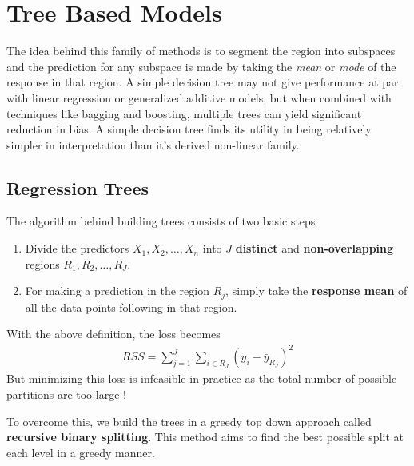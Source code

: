 \documentclass[11pt, a4paper]{article}
\begin{document}
    \section{Tree Based Models}
    The idea behind this family of methods is to segment the region into subspaces and the prediction for any subspace is made by taking the \emph{mean} or \emph{mode} of the response in that region.\newline
    A simple decision tree may not give performance at par with linear regression or generalized additive models, but when combined with techniques like bagging and boosting, multiple trees can yield significant reduction in bias.\newline
    A simple decision tree finds its utility in being relatively simpler in interpretation than it's derived non-linear family.

    \subsection{Regression Trees}
    The algorithm behind building trees consists of two basic steps
    \begin{enumerate}
        \item Divide the predictors $X_{1}, X_{2}, \ldots, X_{n}$ into $J$ \textbf{distinct} and \textbf{non-overlapping} regions $R_{1}, R_{2}, \ldots, R_{J}$.
        \item For making a prediction in the region $R_{j}$, simply take the \textbf{response mean} of all the data points following in that region.
    \end{enumerate}
    With the above definition, the loss becomes
    \begin{align*}
        RSS = \sum_{j=1}^{J} \sum_{i \in R_{J}} (y_{i} - \bar{y}_{R_{J}})^{2}
    \end{align*}
    But minimizing this loss is infeasible in practice as the total number of possible partitions are too large !\newline

    To overcome this, we build the trees in a greedy top down approach called \textbf{recursive binary splitting}. This method aims to find the best possible split at each level in a greedy manner.\newline

\end{document}
